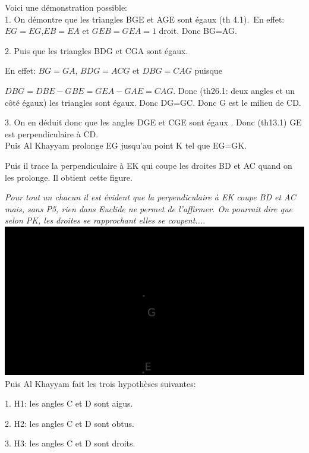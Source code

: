 \documentclass[a4paper, 12pt, twoside]{book}
\begin{document}
 
 Voici une démonstration possible:\\

  
 
 1. On démontre que les triangles BGE et AGE sont égaux (th 4.1).\
 En effet: $EG=EG$,$EB=EA$ et $GEB=GEA=1$ droit. Donc BG=AG.\
 
 
 2. Puis que les triangles BDG et CGA sont égaux.\ 
 
 En effet: $BG=GA$, $BDG=ACG$ et $DBG=CAG$ puisque \
 
 $DBG=DBE-GBE=GEA-GAE=CAG$. Donc (th26.1: deux angles et un côté égaux) les triangles sont égaux. Donc DG=GC. Donc G est le milieu de CD. 
 
 3. On en déduit donc que les angles DGE et CGE sont égaux . Donc (th13.1) GE est perpendiculaire à CD.\\
 
 Puis Al Khayyam prolonge EG jusqu'au point K tel que EG=GK. \
 
 Puis il trace la perpendiculaire à EK qui coupe les droites BD et AC quand on les prolonge. Il obtient cette figure. \
 
 \textit{Pour tout un chacun il est évident que la perpendiculaire à EK coupe BD et AC mais, sans P5, rien dans Euclide ne permet de l'affirmer. On pourrait dire que selon PK, les droites se rapprochant elles se coupent...}.\\
 
 
 
  \includegraphics[scale=0.7]{figures/KHAYYAM3.eps}\\
  
  Puis Al Khayyam fait les trois hypothèses suivantes:\
  
  1. H1: les angles C et D sont aigus.\
  
  2. H2: les angles C et D sont obtus.\
  
  3. H3: les angles C et D sont droits.\\
  
\end{document}
